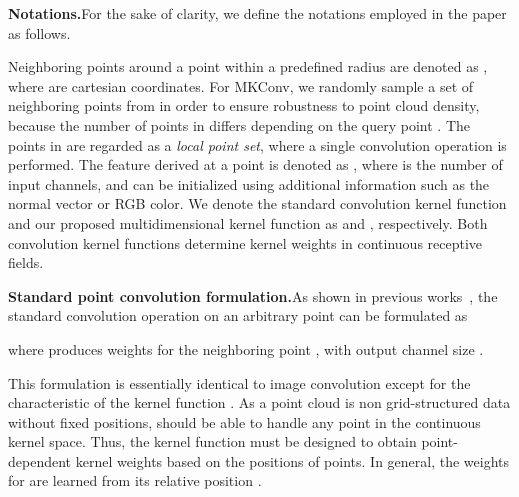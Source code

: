 \documentclass[preprint,12pt]{elsarticle}
\begin{document}
\noindent\textbf{Notations.}\hspace{0.3cm}For the sake of clarity, we define the notations employed in the paper as follows. 

Neighboring points around a point  within a predefined radius  are denoted as 
, where  are cartesian coordinates. For MKConv, we randomly sample a set of  neighboring points  from  in order to ensure robustness to point cloud density, because the number of points in  differs depending on the query point . The points in  are regarded as a \textit{local point set}, where a single convolution operation is performed. The feature derived at a point  is denoted as , where  is the number of input channels, and  can be initialized using additional information such as the normal vector or RGB color. We denote the standard convolution kernel function and our proposed multidimensional kernel function as  and , respectively. Both convolution kernel functions determine kernel weights in continuous receptive fields.

\medskip
\noindent\textbf{Standard point convolution formulation.}\hspace{0.3cm}As shown in previous works~\citep{hermosilla2018monte,wu2019pointconv,thomas2019kpconv,xu2021paconv}, the standard convolution operation on an arbitrary point  can be formulated as

where  produces weights for the neighboring point ,  with output channel size .
\begin{comment}
	
	where  produces a weight vector for the neighboring point  with size identical to feature , and ``'' denotes dot product.content...
\end{comment}
This formulation is essentially identical to image convolution except for the characteristic of the kernel function . As a point cloud is non grid-structured data without fixed positions,  should be able to handle any point in the continuous kernel space. Thus, the kernel function must be designed to obtain point-dependent kernel weights based on the positions of points. In general, the weights for  are learned from its relative position .
\end{document}
